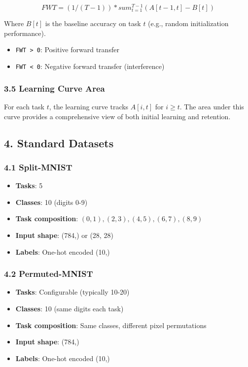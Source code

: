 \documentclass[11pt]{article}
\begin{document}
\[
FWT = (1/(T-1)) * sum_{t=1}^{T-1} (A[t-1, t] - B[t])
\]

Where $B[t]$ is the baseline accuracy on task $t$ (e.g., random initialization performance).

\begin{itemize}[leftmargin=*]
\item \texttt{FWT > 0}: Positive forward transfer
\item \texttt{FWT < 0}: Negative forward transfer (interference)
\end{itemize}

\subsubsection{3.5 Learning Curve Area}

For each task $t$, the learning curve tracks $A[i, t]$ for $i \ge  t$. The area under this curve provides a comprehensive view of both initial learning and retention.

\subsection{4. Standard Datasets}

\subsubsection{4.1 Split-MNIST}

\begin{itemize}[leftmargin=*]
\item \textbf{Tasks}: 5
\item \textbf{Classes}: 10 (digits 0-9)
\item \textbf{Task composition}: ${(0,1), (2,3), (4,5), (6,7), (8,9)}$
\item \textbf{Input shape}: (784,) or (28, 28)
\item \textbf{Labels}: One-hot encoded (10,)
\end{itemize}

\subsubsection{4.2 Permuted-MNIST}

\begin{itemize}[leftmargin=*]
\item \textbf{Tasks}: Configurable (typically 10-20)
\item \textbf{Classes}: 10 (same digits each task)
\item \textbf{Task composition}: Same classes, different pixel permutations
\item \textbf{Input shape}: (784,)
\item \textbf{Labels}: One-hot encoded (10,)
\end{itemize}
\end{document}
